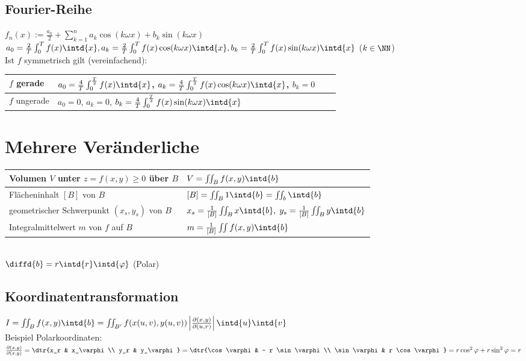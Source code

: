 \documentclass{scrreprt}
\begin{document}
\subsection{Fourier-Reihe}
$f_n(x):= \frac{a_0}{2}+\sum_{k=1}^n a_k \cos (k\omega x) + b_k \sin (k \omega x )$\\
$a_0 = \frac{2}{T}\int_0^T f(x) \intd{x},\\
a_k = \frac{2}{T}\int_0^T f(x) \cos (k \omega x) \intd{x}, \\
b_k = \frac{2}{T} \int_0^T f(x) \sin (k \omega x) \intd{x}$ \qquad ($k\in \NN$)\\
Ist $f$ symmetrisch gilt (vereinfachend):\\
\begin{tabular}{l | l l l }
$f$ gerade & $a_0 = \frac{4}{T}\int_0^{\frac{T}{2}}f(x) \intd{x}$, $ a_k = \frac{4}{T}\int_0^{\frac{T}{2}}f(x) \cos (k\omega x) \intd{x}$, $ b_k =0$\\
\hline
$f$ ungerade & $a_0=0$, $a_k = 0$, $b_k = \frac{4}{T}\int_0^{\frac{T}{2}}f(x) \sin (k\omega x) \intd{x}$
\end{tabular}  

\section{Mehrere Veränderliche}
\begin{tabular}{L{0.5} | L{0.4}}
Volumen $V$ unter $z=f(x,y)\geq 0$ über $B$ & $V=\iint_B f(x,y) \intd{b}$\\
\hline
Flächeninhalt $[B]$ von $B$ & $[B]=\iint_B 1 \intd{b} = \iint_b \intd{b}$\\
\hline
geometrischer Schwerpunkt $(x_s, y_s)$ von $B$ & $x_s=\frac{1}{[B]}\iint_B x \intd{b}, \; y_s=\frac{1}{[B]}\iint_B y \intd{b}$\\
\hline 
Integralmittelwert $m$ von $f$ auf $B$ & $m=\frac{1}{[B]}\iint f(x,y) \intd{b}$
\end{tabular}\\
$\diffd{b} = r\intd{r}\intd{\varphi}$ (Polar)

\subsection{Koordinatentransformation}
$I=\iint_B f(x,y) \intd{b}= \iint_{B'}f(x(u,v), y(u,v)) \left| \frac{\partial (x,y)}{\partial (u,v)}\right| \intd{u}\intd{v}$ \\
Beispiel Polarkoordinaten: $\frac{\partial (x,y)}{\partial (x,y)}=\dtr{x_r & x_\varphi \\ y_r & y_\varphi}=\dtr{\cos \varphi & - r \sin \varphi \\ \sin \varphi & r \cos \varphi} = r \cos ^2\varphi + r \sin^2 \varphi = r$
\end{document}
